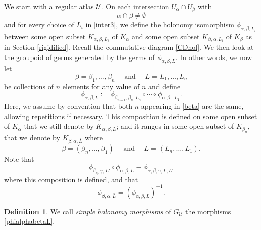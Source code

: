 \documentclass[10pt]{amsart}
\let\mathcal\mathscr
\theoremstyle{plain}
\theoremstyle{definition}
\newtheorem{definition}[theorem]{Definition}
\theoremstyle{remark}
\numberwithin{equation}{section}
\begin{document}
We start with a regular atlas $\mathcal U$. On each intersection $U_{\alpha}\cap U_{\beta}$ with
\begin{equation}
\label{inter3}
\alpha\cap\beta\not=\emptyset
\end{equation}
and for every choice of $L_i$ in \eqref{inter3}, we define the holonomy isomorphism $\phi_{\alpha,\beta, L_i}$ between some open subset $K_{\alpha, \beta, L_i}$ of $K_{\alpha}$ and some open subset $K_{\beta, \alpha, L_i}$ of $K_{\beta}$ as in Section \ref{rigidified}. Recall the commutative diagram \eqref{CDhol}.
We then look at the groupoid of germs generated by the germs of $\phi_{\alpha,\beta, L}$. In other words, we now let
\begin{equation}
\label{beta}
\beta=\beta_1,\hdots,\beta_n\quad\text{ and }\quad L=L_1,\hdots, L_n
\end{equation}
be collections of $n$ elements for any value of $n$ and define
\begin{equation}
\label{phialphabetaL}
\phi_{\alpha,\beta, L}:=\phi_{\beta_{n-1},\beta_n, L_n}\circ\cdots\circ \phi_{\alpha,\beta_1, L_1}.
\end{equation}
Here, we assume by convention that both $n$ appearing in \eqref{beta} are the same, allowing repetitions if necessary. This composition is defined on some open subset of $K_{\alpha}$ that we still denote by $K_{\alpha,\beta, L}$; and it ranges in some open subset of $K_{\beta_n}$, that we denote by $K_{\bar\beta, \alpha, \bar L}$ where
\begin{equation}
\label{barbeta}
\bar\beta=(\beta_n,\hdots,\beta_1)\quad\text{ and }\quad \bar L=(L_n,\hdots, L_1).
\end{equation}
Note that
\begin{equation}
\label{compatibility}
\phi_{\beta_n, \gamma, L'}\circ\phi_{\alpha, \beta, L}\equiv \phi_{\alpha, \beta,\gamma, L, L'}
\end{equation}
where this composition is defined, and that
\begin{equation}
\label{compatibility2}
\phi_{\bar\beta,\alpha, \bar L}=(\phi_{\alpha,\beta, L})^{-1}.
\end{equation}

\begin{definition}
\label{simplegerms}
We call \emph{simple holonomy morphisms} of $G_\mathcal U$ the morphisms \eqref{phialphabetaL}.
\end{definition}
\end{document}
